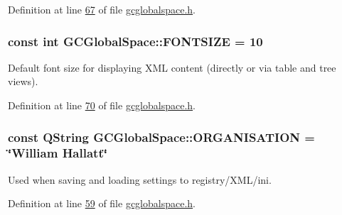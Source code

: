 \-Definition at line \hyperlink{gcglobalspace_8h_source_l00067}{67} of file \hyperlink{gcglobalspace_8h_source}{gcglobalspace.\-h}.

\hypertarget{namespace_g_c_global_space_ab9fa2f10bab070a4f59b7e3ef9166c86}{
\subsubsection[{\-F\-O\-N\-T\-S\-I\-Z\-E}]{\setlength{\rightskip}{0pt plus 5cm}const int {\bf \-G\-C\-Global\-Space\-::\-F\-O\-N\-T\-S\-I\-Z\-E} = 10}}\label{namespace_g_c_global_space_ab9fa2f10bab070a4f59b7e3ef9166c86}


\-Default font size for displaying \-X\-M\-L content (directly or via table and tree views). 



\-Definition at line \hyperlink{gcglobalspace_8h_source_l00070}{70} of file \hyperlink{gcglobalspace_8h_source}{gcglobalspace.\-h}.

\hypertarget{namespace_g_c_global_space_a97583835f9987b1c94ff05802ccfe42f}{
\subsubsection[{\-O\-R\-G\-A\-N\-I\-S\-A\-T\-I\-O\-N}]{\setlength{\rightskip}{0pt plus 5cm}const \-Q\-String {\bf \-G\-C\-Global\-Space\-::\-O\-R\-G\-A\-N\-I\-S\-A\-T\-I\-O\-N} = \char`\"{}\-William \-Hallatt\char`\"{}}}\label{namespace_g_c_global_space_a97583835f9987b1c94ff05802ccfe42f}


\-Used when saving and loading settings to registry/\-X\-M\-L/ini. 



\-Definition at line \hyperlink{gcglobalspace_8h_source_l00059}{59} of file \hyperlink{gcglobalspace_8h_source}{gcglobalspace.\-h}.

